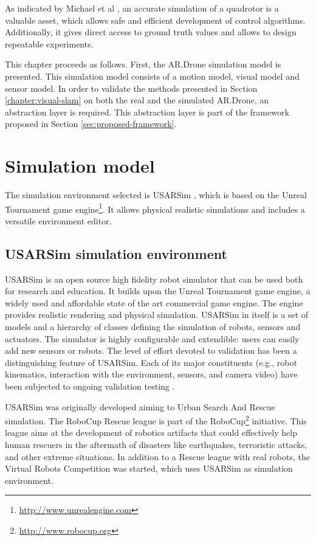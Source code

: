 As indicated by Michael et al \cite{Michael2010ra}, an accurate simulation of a quadrotor is a valuable asset, which allows safe and efficient development of control algorithms. Additionally, it gives direct access to ground truth values and allows to design repeatable experiments.

This chapter proceeds as follows.
First, the AR.Drone simulation model is presented.
This simulation model consists of a motion model, visual model and sensor model.
In order to validate the methods presented in Section \ref{chapter:visual-slam} on both the real and the simulated AR.Drone, an abstraction layer is required.
This abstraction layer is part of the framework proposed in Section \ref{sec:proposed-framework}.

	\section{Simulation model}
The simulation environment selected is USARSim \cite{Balakirsky2009iros,carpin2007usarsim}, which is based on the Unreal Tournament game engine\footnote{\url{http://www.unrealengine.com}}.
It allows physical realistic simulations and includes a versatile environment editor.

		\subsection{USARSim simulation environment}
USARSim is an open source high fidelity robot simulator that can be used both for research and education.
It builds upon the Unreal Tournament game engine, a widely used and affordable state of the art commercial game engine.
The engine provides realistic rendering and physical simulation.
USARSim in itself is a set of models and a hierarchy of classes defining the simulation of robots, sensors and actuators.
The simulator is highly configurable and extendible: users can easily add new sensors or robots.
The level of effort devoted to validation has been a distinguishing feature of USARSim.
Each of its major constituents (e.g., robot kinematics, interaction with the environment, sensors, and camera video) have been subjected to ongoing validation testing \cite{formsma2011realistic,carpin2006high,wang2005validating,carpin2007bridging,carpin2006quantitative}.

USARSim was originally developed aiming to Urban Search And Rescue simulation.
The RoboCup Rescue league is part of the RoboCup\footnote{\url{http://www.robocup.org}} initiative.
This league aims at the development of robotics artifacts that could effectively help human rescuers in the aftermath of disasters like earthquakes, terroristic attacks, and other extreme situations.
In addition to a Rescue league with real robots, the Virtual Robots Competition was started, which uses USARSim as simulation environment.

